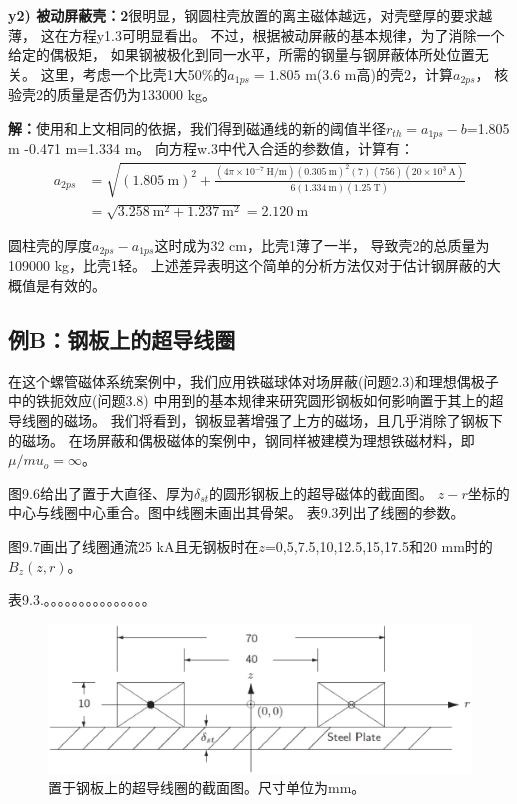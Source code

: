 \textbf{y2) 被动屏蔽壳：2}\qquad 很明显，钢圆柱壳放置的离主磁体越远，对壳壁厚的要求越薄，
这在方程y1.3可明显看出。
不过，根据被动屏蔽的基本规律，为了消除一个给定的偶极矩，
如果钢被极化到同一水平，所需的钢量与钢屏蔽体所处位置无关。
这里，考虑一个比壳1大50\%的$a_{1ps}=1.805$ m(3.6 m高)的壳2，计算$a_{2ps}$，
核验壳2的质量是否仍为133000 kg。

\textbf{解：}使用和上文相同的依据，我们得到磁通线的新的阈值半径$r_{th}=a_{1ps}-b$=1.805 m
-0.471 m=1.334 m。
向方程w.3中代入合适的参数值，计算有：
\begin{align*}%
a_{2ps}&=\sqrt{(1.805\ \mathrm{m})^2+\frac{(4\pi\times 10^{-7}\ \mathrm{H/m})(0.305\ \mathrm{m})^2(7)(756)(20\times 10^3\ \mathrm{A})}{6(1.334\ \mathrm{m})(1.25\ \mathrm{T})}}\\
&=\sqrt{3.258\ \mathrm{m^2}+1.237\ \mathrm{m^2}}=2.120\ \mathrm{m}
\end{align*}

圆柱壳的厚度$a_{2ps}-a_{1ps}$这时成为32 cm，比壳1薄了一半，
导致壳2的总质量为109000 kg，比壳1轻。
上述差异表明这个简单的分析方法仅对于估计钢屏蔽的大概值是有效的。


\subsection{例B：钢板上的超导线圈}
在这个螺管磁体系统案例中，我们应用铁磁球体对场屏蔽(问题2.3)和理想偶极子中的铁扼效应(问题3.8)
中用到的基本规律来研究圆形钢板如何影响置于其上的超导线圈的磁场。
我们将看到，钢板显著增强了上方的磁场，且几乎消除了钢板下的磁场。
在场屏蔽和偶极磁体的案例中，钢同样被建模为理想铁磁材料，即$\mu/mu_o=\infty$。

图9.6给出了置于大直径、厚为$\delta_{st}$的圆形钢板上的超导磁体的截面图。
$z-r$坐标的中心与线圈中心重合。图中线圈未画出其骨架。
表9.3列出了线圈的参数。

图9.7画出了线圈通流25 kA且无钢板时在$z$=0,5,7.5,10,12.5,15,17.5和20 mm时的$B_z(z,r)$。

表9.3.。。。。。。。。。。。。。。。

\begin{figure}
	\centering
	\includegraphics[scale=0.5]{chpt9/figs/fig9.6.eps}
	\caption{置于钢板上的超导线圈的截面图。尺寸单位为mm。}
\end{figure}


